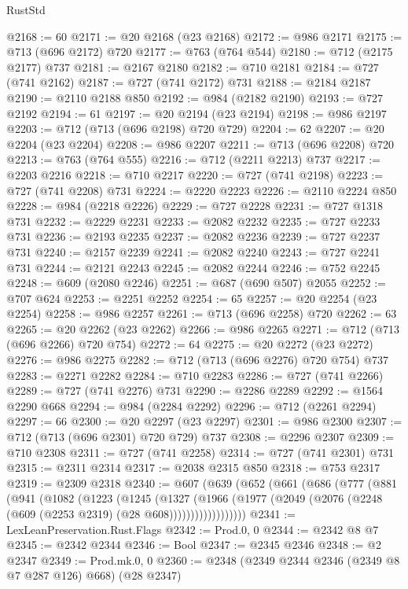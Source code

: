 \begin{lexlean}{RustStd}
\begin{coremodule}
@2168 := 60
@2171 := @20 @2168 (@23 @2168)
@2172 := @986 @2171
@2175 := @713 (@696 @2172) @720
@2177 := @763 (@764 @544)
@2180 := @712 (@2175 @2177) @737
@2181 := @2167 @2180
@2182 := @710 @2181
@2184 := @727 (@741 @2162)
@2187 := @727 (@741 @2172) @731
@2188 := @2184 @2187
@2190 := @2110 @2188 @850
@2192 := @984 (@2182 @2190)
@2193 := @727 @2192
@2194 := 61
@2197 := @20 @2194 (@23 @2194)
@2198 := @986 @2197
@2203 := @712 (@713 (@696 @2198) @720 @729)
@2204 := 62
@2207 := @20 @2204 (@23 @2204)
@2208 := @986 @2207
@2211 := @713 (@696 @2208) @720
@2213 := @763 (@764 @555)
@2216 := @712 (@2211 @2213) @737
@2217 := @2203 @2216
@2218 := @710 @2217
@2220 := @727 (@741 @2198)
@2223 := @727 (@741 @2208) @731
@2224 := @2220 @2223
@2226 := @2110 @2224 @850
@2228 := @984 (@2218 @2226)
@2229 := @727 @2228
@2231 := @727 @1318 @731
@2232 := @2229 @2231
@2233 := @2082 @2232
@2235 := @727 @2233 @731
@2236 := @2193 @2235
@2237 := @2082 @2236
@2239 := @727 @2237 @731
@2240 := @2157 @2239
@2241 := @2082 @2240
@2243 := @727 @2241 @731
@2244 := @2121 @2243
@2245 := @2082 @2244
@2246 := @752 @2245
@2248 := @609 (@2080 @2246)
@2251 := @687 (@690 @507) @2055
@2252 := @707 @624
@2253 := @2251 @2252
@2254 := 65
@2257 := @20 @2254 (@23 @2254)
@2258 := @986 @2257
@2261 := @713 (@696 @2258) @720
@2262 := 63
@2265 := @20 @2262 (@23 @2262)
@2266 := @986 @2265
@2271 := @712 (@713 (@696 @2266) @720 @754)
@2272 := 64
@2275 := @20 @2272 (@23 @2272)
@2276 := @986 @2275
@2282 := @712 (@713 (@696 @2276) @720 @754) @737
@2283 := @2271 @2282
@2284 := @710 @2283
@2286 := @727 (@741 @2266)
@2289 := @727 (@741 @2276) @731
@2290 := @2286 @2289
@2292 := @1564 @2290 @668
@2294 := @984 (@2284 @2292)
@2296 := @712 (@2261 @2294)
@2297 := 66
@2300 := @20 @2297 (@23 @2297)
@2301 := @986 @2300
@2307 := @712 (@713 (@696 @2301) @720 @729) @737
@2308 := @2296 @2307
@2309 := @710 @2308
@2311 := @727 (@741 @2258)
@2314 := @727 (@741 @2301) @731
@2315 := @2311 @2314
@2317 := @2038 @2315 @850
@2318 := @753 @2317
@2319 := @2309 @2318
@2340 := @607
    (@639
      (@652
        (@661
          (@686
            (@777
              (@881
                (@941
                  (@1082
                    (@1223
                      (@1245
                        (@1327
                          (@1966
                            (@1977
                              (@2049 (@2076 (@2248 (@609 (@2253 @2319) (@28 @608))))))))))))))))))
@2341 := LexLeanPreservation.Rust.Flags
@2342 := Prod.{0, 0}
@2344 := @2342 @8 @7
@2345 := @2342 @2344
@2346 := Bool
@2347 := @2345 @2346
@2348 := @2 @2347
@2349 := Prod.mk.{0, 0}
@2360 := @2348 (@2349 @2344 @2346 (@2349 @8 @7 @287 @126) @668) (@28 @2347)

\end{coremodule}
\end{lexlean}
